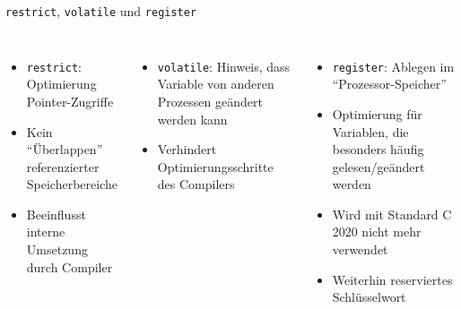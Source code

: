 \begin{frame}[fragile]{\texttt{restrict}, \texttt{volatile} und \texttt{register}}
%
\begin{columns}[T]
\begin{itemize}
\item \texttt{restrict}: Optimierung Pointer-Zugriffe
\item Kein \enquote{Überlappen} referenzierter Speicherbereiche
\item Beeinflusst interne Umsetzung durch Compiler
\end{itemize}

\vspace{6pt}
\begin{itemize}
\item \texttt{volatile}: Hinweis, dass Variable von anderen Prozessen geändert werden kann
\item Verhindert Optimierungsschritte des Compilers
\end{itemize}
%
\begin{itemize}
\item \texttt{register}: Ablegen im \enquote{Prozessor-Speicher}
\item Optimierung für Variablen, die besonders häufig gelesen/geändert werden
\item Wird mit Standard C 2020 nicht mehr verwendet
\item Weiterhin reserviertes Schlüsselwort
\end{itemize}
\end{columns}
%
\end{frame}


